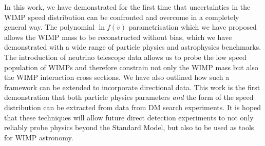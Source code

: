 In this work, we have demonstrated for the first time that uncertainties in the WIMP speed distribution can be confronted and overcome in a completely general way. The polynomial $\ln f(v)$ parametrisation which we have proposed allows the WIMP mass to be reconstructed without bias, which we have demonstrated with a wide range of particle physics and astrophysics benchmarks. The introduction of neutrino telescope data allows us to probe the low speed population of WIMPs and therefore constrain not only the WIMP mass but also the WIMP interaction cross sections. We have also outlined how such a framework can be extended to incorporate directional data. This work is the first demonstration that both particle physics parameters \textit{and} the form of the speed distribution can be extracted from data from DM search experiments. It is hoped that these techniques will allow future direct detection experiments to not only reliably probe physics beyond the Standard Model, but also to be used as tools for WIMP astronomy.




